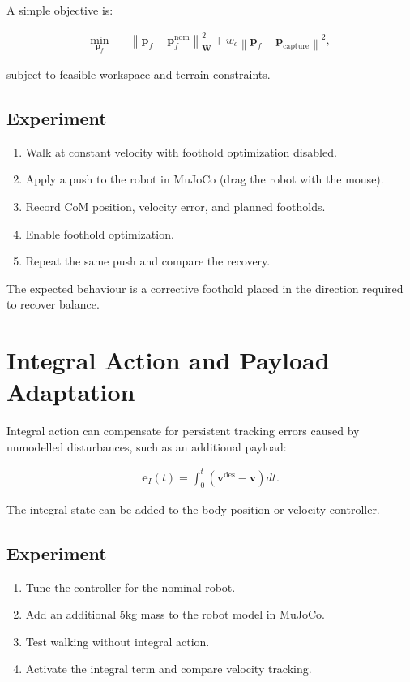 \documentclass[11pt,a4paper]{article}
\begin{document}
A simple objective is:

\begin{align*}
\min_{\bm{p}_f}
\quad &
\left\|
\bm{p}_f-\bm{p}_f^{\mathrm{nom}}
\right\|_{\bm{W}}^2
+
w_c
\left\|
\bm{p}_f-\bm{p}_{\mathrm{capture}}
\right\|^2,
\end{align*}

subject to feasible workspace and terrain constraints.

\subsection*{Experiment}

\begin{enumerate}[label=\arabic*.]
    \item Walk at constant velocity with foothold optimization disabled.
    \item Apply a push to the robot in MuJoCo (drag the robot with the mouse).
    \item Record CoM position, velocity error, and planned footholds.
    \item Enable foothold optimization.
    \item Repeat the same push and compare the recovery.
\end{enumerate}

The expected behaviour is a corrective foothold placed in the direction required to recover balance.

\section{Integral Action and Payload Adaptation}

Integral action can compensate for persistent tracking errors caused by unmodelled disturbances, such as an additional payload:

\begin{align*}
\bm{e}_I(t)
=
\int_{0}^{t}
\left(
\bm{v}^{\mathrm{des}}-\bm{v}
\right)
dt.
\end{align*}

The integral state can be added to the body-position or velocity controller.

\subsection*{Experiment}

\begin{enumerate}[label=\arabic*.]
    \item Tune the controller for the nominal robot.
    \item Add an additional 5kg mass to the robot model in MuJoCo.
    \item Test walking without integral action.
    \item Activate the integral term and compare velocity tracking.
\end{enumerate}
\end{document}
